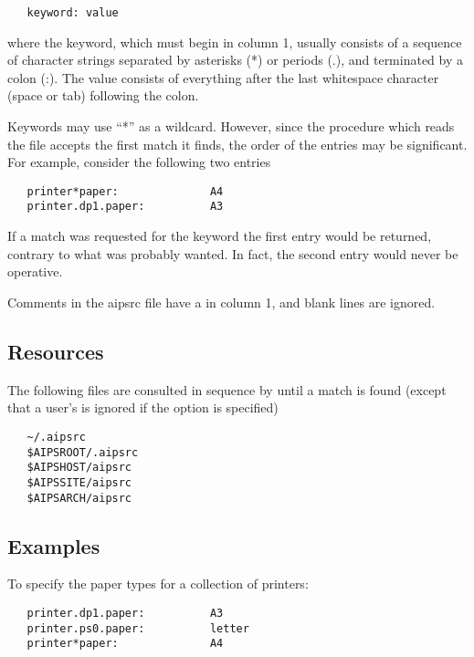 \begin{verbatim}
   keyword: value
\end{verbatim}

\noindent
where the keyword, which must begin in column 1, usually consists of a
sequence of character strings separated by asterisks (*) or periods (.), and
terminated by a colon (:).  The value consists of everything after the last
whitespace character (space or tab) following the colon.

Keywords may use ``*'' as a wildcard.  However, since the procedure which
reads the  file accepts the first match it finds, the order of
the entries may be significant.  For example, consider the following two
 entries

\begin{verbatim}
   printer*paper:              A4
   printer.dp1.paper:          A3
\end{verbatim}

\noindent
If a match was requested for the keyword  the first
entry would be returned, contrary to what was probably wanted.  In fact, the
second entry would never be operative.

Comments in the aipsrc file have a \code{\#} in column 1, and blank lines are
ignored.

\subsection*{Resources}

The following  files are consulted in sequence by 
until a match is found (except that a user's  is ignored if
the  option is specified)

\begin{verbatim}
   ~/.aipsrc
   $AIPSROOT/.aipsrc
   $AIPSHOST/aipsrc
   $AIPSSITE/aipsrc
   $AIPSARCH/aipsrc
\end{verbatim}

\subsection*{Examples}

To specify the paper types for a collection of printers:

\begin{verbatim}
   printer.dp1.paper:          A3
   printer.ps0.paper:          letter
   printer*paper:              A4
\end{verbatim}

